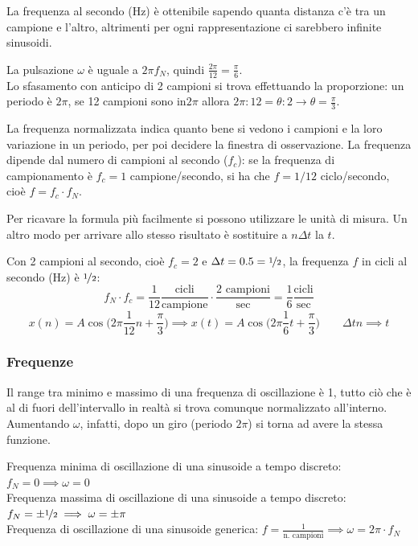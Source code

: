 La frequenza al secondo (Hz) è ottenibile sapendo quanta distanza c'è tra un campione e l'altro, altrimenti per ogni rappresentazione ci sarebbero infinite sinusoidi.

La pulsazione $\omega$ è uguale a $2\pi f_N$, quindi $\frac{2\pi}{12} = \frac{\pi}{6}$. \\
Lo sfasamento con anticipo di 2 campioni si trova effettuando la proporzione: un periodo è $2\pi$, se 12 campioni sono in$2\pi$ allora $2\pi : 12 = \theta : 2 \rightarrow \theta = \frac{\pi}{3}$.

La frequenza normalizzata indica quanto bene si vedono i campioni e la loro variazione in un periodo, per poi decidere la finestra di osservazione. La frequenza dipende dal numero di campioni al secondo ($f_c$): se la frequenza di campionamento è $f_c = 1$ campione/secondo, si ha che $f = 1/12$ ciclo/secondo, cioè $f = f_c \cdot f_N$.

Per ricavare la formula più facilmente si possono utilizzare le unità di misura. Un altro modo per arrivare allo stesso risultato è sostituire a $n\Delta t$ la $t$.

Con 2 campioni al secondo, cioè $f_c = 2$ e $\Delta t = 0.5 = \nicefrac{1}{2}$, la frequenza $f$ in cicli al secondo (Hz) è $\nicefrac{1}{2}$:
$$f_N \cdot f_c = \frac{1}{12} \frac{\text{cicli}}{\text{campione}} \cdot \frac{2 \text{ campioni}}{\text{sec}} = \frac{1}{6} \frac{\text{cicli}}{\text{sec}}$$
$$x(n) = A\cos \Big(2\pi \frac{1}{12}n + \frac{\pi}{3}\Big) \implies x(t) = A\cos\Big(2\pi \frac{1}{6}t + \frac{\pi}{3}\Big) \qquad \Delta tn \implies t$$

\subsubsection{Frequenze}
Il range tra minimo e massimo di una frequenza di oscillazione è 1, tutto ciò che è al di fuori dell'intervallo in realtà si trova comunque normalizzato all'interno. Aumentando $\omega$, infatti, dopo un giro (periodo $2\pi$) si torna ad avere la stessa funzione. 

Frequenza minima di oscillazione di una sinusoide a tempo discreto: $f_N = 0 \implies \omega = 0$ \\
Frequenza massima di oscillazione di una sinusoide a tempo discreto: $f_N = \pm \nicefrac{1}{2} \implies \omega = \pm \pi$ \\
Frequenza di oscillazione di una sinusoide generica: $f = \frac{1}{\text{n. campioni}} \implies \omega = 2\pi \cdot f_N$

